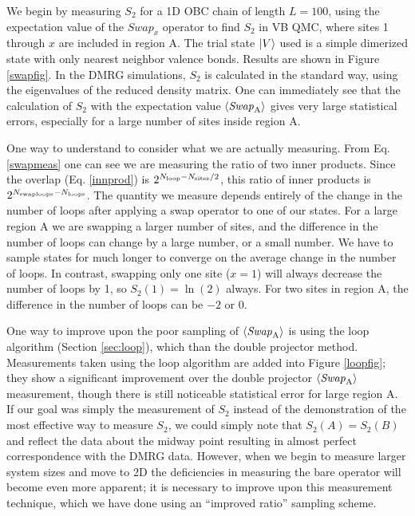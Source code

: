 We begin by measuring $S_2$ for a 1D OBC chain of length $L=100$, using the expectation value of the $Swap_x$ operator to find $S_2$ in VB QMC, where sites 1 through $x$ are included in region A. 
The trial state $\lvert {V} \rangle$ used is a simple dimerized state with only nearest neighbor valence bonds.
Results are shown in Figure \ref{swapfig}.
In the DMRG simulations, $S_2$ is calculated in the standard way, using the eigenvalues of the reduced density matrix. 
One can immediately see that the calculation of $S_2$ with the expectation value $\langle {\it Swap}_{\rm A} \rangle$ gives very large statistical errors, especially for a large number of sites inside region A.

One way to understand to consider what we are actually measuring.
From Eq. \eqref{swapmeas} one can see we are measuring the ratio of two inner products.
Since the overlap (Eq. \eqref{innprod}) is $2^{N_{\rm loop} - N_{\rm sites}/2}$, this ratio of inner products is $2^{N_{\rm swaploops} - N_{\rm loops}}$.
The quantity we measure depends entirely of the change in the number of loops after applying a swap operator to one of our states. 
For a large region A we are swapping a larger number of sites, and the difference in the number of loops can change by a large number, or a small number. 
We have to sample states for much longer to converge on the average change in the number of loops.
In contrast, swapping only one site ($x=1$) will always decrease the number of loops by 1, so $S_2(1)=\ln(2)$ always.
For two sites in region A, the difference in the number of loops can be $-2$ or 0.  

One way to improve upon the poor sampling of  $\langle {\it Swap}_{\rm A} \rangle$ is using the loop algorithm (Section \ref{sec:loop}), which  than the double projector method.
Measurements taken using the loop algorithm are added into Figure \ref{loopfig}; they show a significant improvement over the double projector $\langle {\it Swap}_{\rm A} \rangle$ measurement, 
though there is still noticeable statistical error for large region A.
If our goal was simply the measurement of $S_2$ instead of the demonstration of the most effective way to measure $S_2$, we could simply note that $S_2(A) = S_2(B)$ and reflect the data about the midway point resulting in almost perfect correspondence with the DMRG data.
However, when we begin to measure larger system sizes and move to 2D the deficiencies in measuring the bare \swa operator will become even more apparent; it is necessary to improve upon this measurement technique, which we have done using an ``improved ratio'' sampling scheme.




